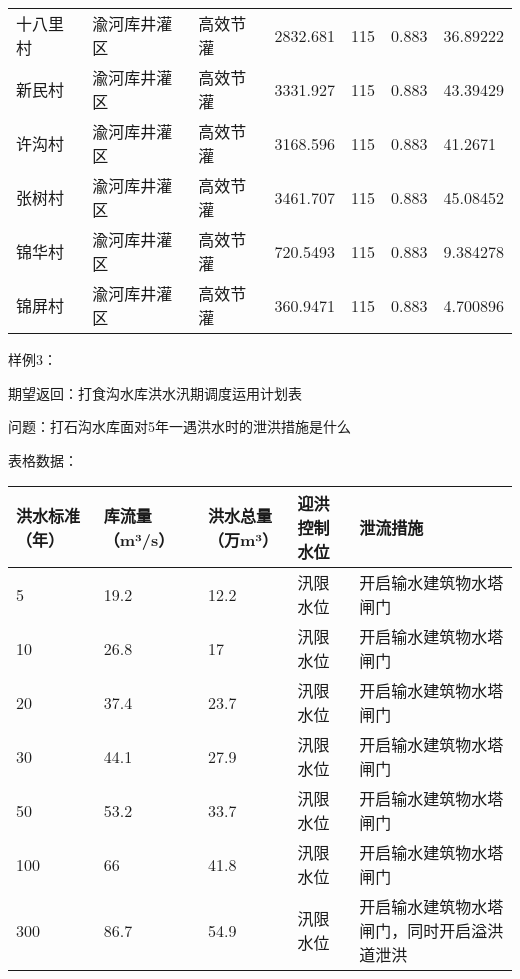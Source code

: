 \begin{table}[htbp]
\begin{tabular}{p{1.5cm}p{1.5cm}p{1.5cm}p{1.5cm}p{1.5cm}p{1.5cm}p{1.5cm}}
    十八里村 & 渝河库井灌区 & 高效节灌 & 2832.681 & 115 & 0.883 & 36.89222 \\
    新民村 & 渝河库井灌区 & 高效节灌 & 3331.927 & 115 & 0.883 & 43.39429 \\
    许沟村 & 渝河库井灌区 & 高效节灌 & 3168.596 & 115 & 0.883 & 41.2671 \\
    张树村 & 渝河库井灌区 & 高效节灌 & 3461.707 & 115 & 0.883 & 45.08452 \\
    锦华村 & 渝河库井灌区 & 高效节灌 & 720.5493 & 115 & 0.883 & 9.384278 \\
    锦屏村 & 渝河库井灌区 & 高效节灌 & 360.9471 & 115 & 0.883 & 4.700896 \\
    \bottomrule
    \end{tabular}
\end{table}
\newpage
样例3：

期望返回：打食沟水库洪水汛期调度运用计划表

问题：打石沟水库面对5年一遇洪水时的泄洪措施是什么

表格数据：

\begin{table}[htbp]
    \centering
    \footnotesize
    \begin{tabular}{p{2cm}p{2cm}p{2cm}p{2cm}p{2cm}}
    \toprule
    \textbf{洪水标准（年）} & \textbf{库流量（m³/s）} & \textbf{洪水总量（万m³）} & \textbf{迎洪控制水位} & \textbf{泄流措施} \\
    \midrule
    5 & 19.2 & 12.2 & 汛限水位 & 开启输水建筑物水塔闸门 \\
    10 & 26.8 & 17 & 汛限水位 & 开启输水建筑物水塔闸门 \\
    20 & 37.4 & 23.7 & 汛限水位 & 开启输水建筑物水塔闸门 \\
    30 & 44.1 & 27.9 & 汛限水位 & 开启输水建筑物水塔闸门 \\
    50 & 53.2 & 33.7 & 汛限水位 & 开启输水建筑物水塔闸门 \\
    100 & 66 & 41.8 & 汛限水位 & 开启输水建筑物水塔闸门 \\
    300 & 86.7 & 54.9 & 汛限水位 & 开启输水建筑物水塔闸门，同时开启溢洪道泄洪 \\
    \bottomrule
    \end{tabular}
    \end{table}
